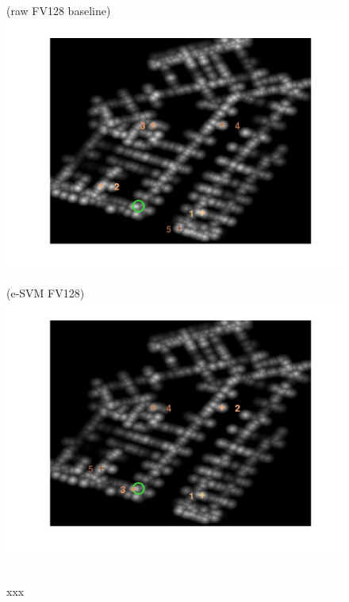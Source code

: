 \documentclass[10pt,onecolumn,A4]{article}
\begin{document}
\begin{figure}
	\begin{minipage}{0.45\linewidth}
		\center
		(raw FV128 baseline) \\
		\includegraphics[trim = 55mm 40mm 55mm 25mm, clip=true,width=\linewidth]{sup1693/heatRaw.jpg}
	\end{minipage} 
	\begin{minipage}{0.45\linewidth}
		\center
		(e-SVM FV128) \\
		\includegraphics[trim = 55mm 40mm 55mm 25mm, clip=true,width=\linewidth]{sup1693/heatSvm.jpg}
	\end{minipage} 
	\\
	\textcolor{myWhite}{xxx}\\

\end{figure}
\end{document}

